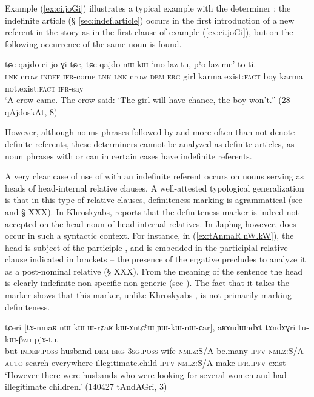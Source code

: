 Example (\ref{ex:ci.joGi}) illustrates a typical example with the determiner ; the indefinite article  (§ \ref{sec:indef.article}) occurs in the first introduction of a new referent in the story as in the first clause of example (\ref{ex:ci.joGi}), but on the following occurrence of the same noun  is found.

\begin{exe}
\ex \label{ex:ci.joGi}
 \gll  tɕe qajdo ci jo-ɣi tɕe, tɕe qajdo nɯ kɯ `mo laz tu, pʰo laz me' to-ti. \\
 \textsc{lnk} crow \textsc{indef} \textsc{ifr}-come \textsc{lnk} \textsc{lnk} crow \textsc{dem} \textsc{erg} girl karma exist:\textsc{fact} boy karma not.exist:\textsc{fact} \textsc{ifr}-say \\
 \glt `A crow came. The crow said: `The girl will have chance, the boy won't.'' (28-qAjdoskAt, 8)
\end{exe}

However, although nouns phrases followed by  and  more often than not denote definite referents, these determiners cannot be analyzed as definite articles, as noun phrases with  or  can in certain cases have indefinite referents. 

A very clear case of use of  with an indefinite referent occurs on nouns serving as heads of head-internal relative clauses. A well-attested typological generalization is that in this type of relative clauses, definiteness marking is agrammatical (see \citealt{basilico96internally} and § XXX). In Khroskyabs, \citet[636]{lai17khroskyabs} reports that the definiteness marker  is indeed not accepted on the head noun of head-internal relatives. In Japhug however,  does occur in such a syntactic context. For instance, in (\ref{ex:tAnmaR.nW.kW}), the head  is subject of the participle , and is embedded in the participial relative clause indicated in brackets -- the presence of the ergative  precludes to analyze it as a post-nominal relative (§ XXX). From the meaning of the sentence the head  is clearly indefinite non-specific non-generic  (see \citealt[286-291]{lehmann84relativsatz}). The fact that it takes the marker  shows that this marker, unlike Khroskyabs , is not primarily marking definiteness.

\begin{exe}
\ex \label{ex:tAnmaR.nW.kW}
 \gll tɕeri [tɤ-nmaʁ nɯ kɯ ɯ-rʑaʁ kɯ-ɤntɕʰɯ ɲɯ-kɯ-nɯ-ɕar], aʁɤndɯndɤt tɤndɤɣri tu-kɯ-βzu pjɤ-tu.  \\
but  \textsc{indef}.\textsc{poss}-husband \textsc{dem} \textsc{erg} \textsc{3sg}.\textsc{poss}-wife  \textsc{nmlz}:S/A-be.many \textsc{ipfv}-\textsc{nmlz}:S/A-\textsc{auto}-search everywhere  illegitimate.child  \textsc{ipfv}-\textsc{nmlz}:S/A-make \textsc{ifr}.\textsc{ipfv}-exist \\
\glt `However there were husbands who were looking for several women and had illegitimate children.' (140427 tAndAGri, 3)
\end{exe}

